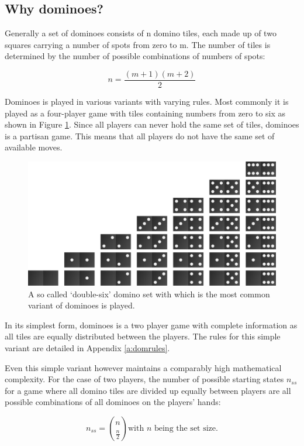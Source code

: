 \documentclass[12pt,a4paper]{article}
\begin{document}
\subsection{Why dominoes?}
Generally a set of dominoes consists of n domino tiles, each made up of two squares carrying a number of spots from zero to m. The number of tiles is determined by the number of possible combinations of numbers of spots:

\[n = \frac{(m+1)(m+2)}{2}\]


Dominoes is played in various variants with varying rules. Most commonly it is played as a four-player game with tiles containing numbers from zero to six as shown in Figure \ref{fig:dom_set}. Since all players can never hold the same set of tiles, dominoes is a partisan game. This means that all players do not have the same set of available moves.

\begin{figure}
  \includegraphics[width=\linewidth]{img/dominomatrix.png}
  \caption{A so called ‘double-six’ domino set with which is the most common variant of dominoes is played.}
  \label{fig:dom_set}
\end{figure}

In its simplest form, dominoes is a two player game with complete information as all tiles are equally distributed between the players. The rules for this simple variant are detailed in Appendix \ref{a:domrules}.

Even this simple variant however maintains a comparably high mathematical complexity. For the case of two players, the number of possible starting states $n_{ss}$ for a game where all domino tiles are divided up equally between players are all possible combinations of all dominoes on the players’ hands:

\[n_{ss} = \binom{n}{\frac{n}{2}} \textrm{with $n$ being the set size.} \] 
\end{document}
